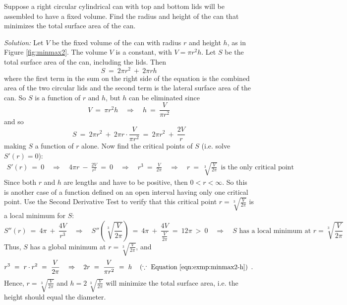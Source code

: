 \begin{exmp}\label{exmp:minmax2}
 \piccaption[]{\label{fig:minmax2}}
\noindent Suppose a right circular cylindrical can with top and bottom lids will
be assembled to have a fixed volume. Find the radius and height of the
can that minimizes the total surface area of the can.\vspace{1mm}
\par\noindent\emph{Solution:} Let $V$ be the fixed volume of the can with radius
$r$ and height $h$, as in Figure \ref{fig:minmax2}. The volume $V$ is a
constant, with $V = \pi r^2h$. Let $S$ be the total surface area of the can,
including the lids. Then
\[
S ~=~ 2\pi r^2 ~+~ 2\pi rh
\]
where the first term in the sum on the right side of the equation is the
combined area of the two circular lids and the second term is the lateral
surface area of the can. So $S$ is a function of $r$ and $h$, but $h$ can be
eliminated since
\begin{equation}\label{eqn:exmp:minmax2-h}
V ~=~ \pi r^2h \quad\Rightarrow\quad h ~=~ \frac{V}{\pi r^2}
\end{equation}
and so
\[
S ~=~ 2\pi r^2 ~+~ 2\pi r \cdot \frac{V}{\pi r^2} ~=~ 2\pi r^2 ~+~ \frac{2V}{r}
\]
making $S$ a function of $r$ alone. Now find the critical points of $S$ (i.e.
solve $S'(r)=0$):
\begin{align*}
S'(r) ~=~ 0 \quad\Rightarrow\quad 4\pi r ~-~ \frac{2V}{r^2} ~=~ 0
\quad\Rightarrow\quad r^3 ~=~ \frac{V}{2\pi}
\quad\Rightarrow\quad r ~=~ \sqrt[3]{\frac{V}{2\pi}} ~~\text{is the only critical point}
\end{align*}
Since both $r$ and $h$ are lengths and have to be positive, then
$0 < r < \infty$. So this is another case of a function defined on an open
interval having only one critical point. Use the Second Derivative Test to
verify that this critical point $r=\sqrt[3]{\frac{V}{2\pi}}$ is a local minimum
for $S$:
\[
S''(r) ~=~ 4\pi ~+~ \frac{4V}{r^3} \quad\Rightarrow\quad
S''\left(\sqrt[3]{\frac{V}{2\pi}}\right) ~=~ 4\pi ~+~ \frac{4V}{\frac{V}{2\pi}}
 ~=~ 12\pi ~>~ 0
\quad\Rightarrow\quad\text{$S$ has a local minimum at $r = \sqrt[3]{\frac{V}{2\pi}}$}
\]
Thus, $S$ has a global minimum at $r = \sqrt[3]{\frac{V}{2\pi}}$, and
\[
r^3 ~=~ r \cdot r^2 ~=~ \frac{V}{2\pi} \quad\Rightarrow\quad
2r ~=~ \frac{V}{\pi r^2} ~=~ h \quad\left(\because~\text{Equation}~\ref{eqn:exmp:minmax2-h}\right)~.
\]
Hence, $r = \sqrt[3]{\frac{V}{2\pi}}$ and $h = 2\,\sqrt[3]{\frac{V}{2\pi}}$ will
minimize the total surface area, i.e. the height should equal the diameter.\vspace{2mm}


\end{exmp}
